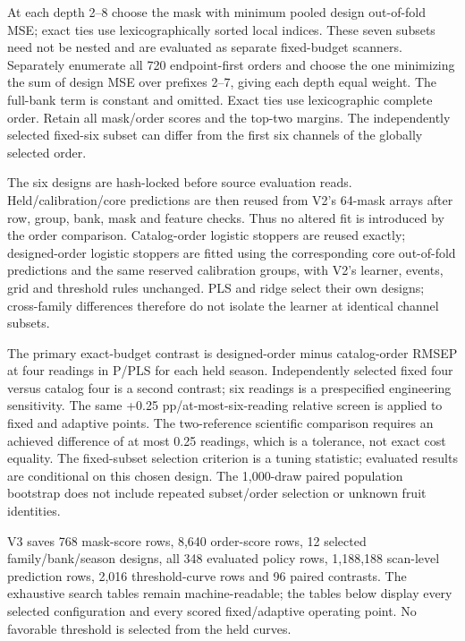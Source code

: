 \documentclass[10pt,a4paper]{article}
\begin{document}
At each depth 2--8 choose the mask with minimum pooled design out-of-fold MSE; exact ties use lexicographically sorted local indices. These seven subsets need not be nested and are evaluated as separate fixed-budget scanners. Separately enumerate all 720 endpoint-first orders and choose the one minimizing the sum of design MSE over prefixes 2--7, giving each depth equal weight. The full-bank term is constant and omitted. Exact ties use lexicographic complete order. Retain all mask/order scores and the top-two margins. The independently selected fixed-six subset can differ from the first six channels of the globally selected order.

The six designs are hash-locked before source evaluation reads. Held/calibration/core predictions are then reused from V2's 64-mask arrays after row, group, bank, mask and feature checks. Thus no altered fit is introduced by the order comparison. Catalog-order logistic stoppers are reused exactly; designed-order logistic stoppers are fitted using the corresponding core out-of-fold predictions and the same reserved calibration groups, with V2's learner, events, grid and threshold rules unchanged. PLS and ridge select their own designs; cross-family differences therefore do not isolate the learner at identical channel subsets.

The primary exact-budget contrast is designed-order minus catalog-order RMSEP at four readings in P/PLS for each held season. Independently selected fixed four versus catalog four is a second contrast; six readings is a prespecified engineering sensitivity. The same +0.25 pp/at-most-six-reading relative screen is applied to fixed and adaptive points. The two-reference scientific comparison requires an achieved difference of at most 0.25 readings, which is a tolerance, not exact cost equality. The fixed-subset selection criterion is a tuning statistic; evaluated results are conditional on this chosen design. The 1,000-draw paired population bootstrap does not include repeated subset/order selection or unknown fruit identities.

V3 saves 768 mask-score rows, 8,640 order-score rows, 12 selected family/bank/season designs, all 348 evaluated policy rows, 1,188,188 scan-level prediction rows, 2,016 threshold-curve rows and 96 paired contrasts. The exhaustive search tables remain machine-readable; the tables below display every selected configuration and every scored fixed/adaptive operating point. No favorable threshold is selected from the held curves.
\end{document}
